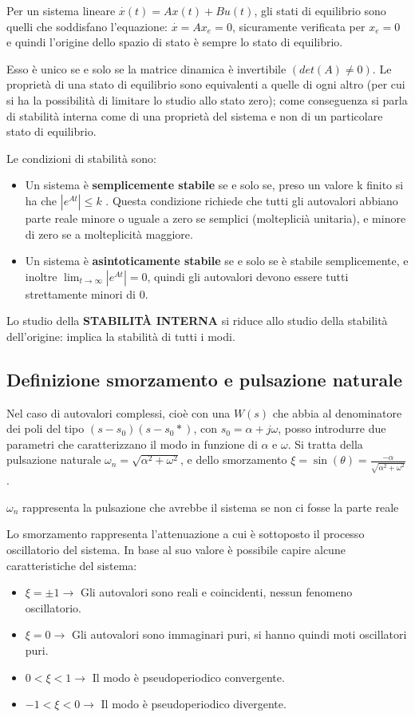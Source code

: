 \documentclass{article}
\begin{document}
Per un sistema lineare $\overset{\cdot}{x}(t)=Ax(t)+B u(t)$,
gli stati di equilibrio sono quelli che soddisfano
l'equazione: $\overset{\cdot}{x} = A x_e = 0$, sicuramente verificata per $x_e=0$ e quindi l'origine dello spazio di stato è sempre
lo stato di equilibrio.

Esso è unico se e solo se la matrice dinamica è invertibile  $(det(A)\neq 0)$.
Le proprietà di una stato di equilibrio sono equivalenti a quelle di ogni altro (per cui si ha la possibilità di limitare lo studio allo stato zero);
come conseguenza si parla di stabilità interna come di una proprietà del sistema e non di un particolare stato di equilibrio.

Le condizioni di stabilità sono:
\begin{itemize}
    \item Un sistema è \textbf{semplicemente stabile} se e solo se, preso un valore k finito si ha che ${|e^{At}|\leq k}$ .
    Questa condizione richiede che tutti gli autovalori abbiano
    parte reale minore o uguale a zero se semplici (molteplicià unitaria), e minore di zero se a molteplicità maggiore.
    \item Un sistema è \textbf{asintoticamente stabile} se e solo se è stabile semplicemente,
    e inoltre \(\displaystyle \lim_{t \to\infty }|e^{At}|=0 \), quindi gli autovalori devono essere tutti strettamente minori di 0.
\end{itemize}

Lo studio della \textbf{STABILITÀ INTERNA} si riduce allo studio della stabilità dell'origine: implica la stabilità di tutti i modi.

\subsection{Definizione smorzamento e pulsazione naturale}
Nel caso di autovalori complessi, cioè con una $W(s)$ che abbia  al denominatore 
dei poli del tipo $(s-s_0)(s-s_0*)$, con $s_0 = \alpha+j\omega$,
posso introdurre due parametri che caratterizzano il modo in funzione di $\alpha$ e $\omega$.
Si tratta della pulsazione naturale $\omega _n = \sqrt{\alpha^2 + \omega^2}$,
e dello smorzamento $\xi = \sin(\theta) = \frac{-\alpha}{\sqrt{\alpha^2 + \omega^2}} $.

$\omega_n$ rappresenta la pulsazione che avrebbe il sistema se non ci fosse la parte reale

Lo smorzamento rappresenta l'attenuazione a cui è sottoposto il processo oscillatorio del sistema.
In base al suo valore è possibile capire alcune caratteristiche del sistema:
\begin{itemize}
    \item $\xi = \pm 1 \to $ Gli autovalori sono reali e coincidenti, nessun fenomeno oscillatorio.
    \item $\xi = 0 \to$ Gli autovalori sono immaginari puri, si hanno quindi moti oscillatori puri.
    \item $0<\xi<1 \to$ Il modo è pseudoperiodico convergente.
    \item $-1<\xi<0 \to$ Il modo è  pseudoperiodico divergente.
\end{itemize}
\end{document}
